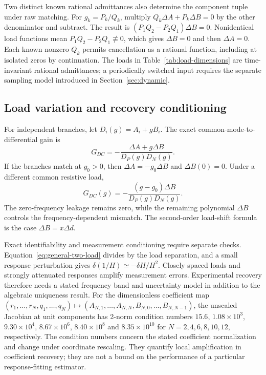 Two distinct known rational admittances also determine the component tuple under raw matching. For $g_k=P_k/Q_k$, multiply $Q_k\Delta A+P_k\Delta B=0$ by the other denominator and subtract. The result is $(P_1Q_2-P_2Q_1)\Delta B=0$. Nonidentical load functions mean $P_1Q_2-P_2Q_1\not\equiv0$, which gives $\Delta B=0$ and then $\Delta A=0$. Each known nonzero $Q_k$ permits cancellation as a rational function, including at isolated zeros by continuation. The loads in Table~\ref{tab:load-dimensions} are time-invariant rational admittances; a periodically switched input requires the separate sampling model introduced in Section~\ref{sec:dynamic}.

\subsection{Load variation and recovery conditioning}

For independent branches, let $D_i(g)=A_i+gB_i$. The exact common-mode-to-differential gain is
\begin{equation}\label{eq:general-leakage}
G_{DC}=-\frac{\Delta A+g\Delta B}{D_P(g)D_N(g)}.
\end{equation}
If the branches match at $g_0>0$, then $\Delta A=-g_0\Delta B$ and $\Delta B(0)=0$. Under a different common resistive load,
\begin{equation}\label{eq:general-load-shift}
G_{DC}(g)=-\frac{(g-g_0)\Delta B}{D_P(g)D_N(g)}.
\end{equation}
The zero-frequency leakage remains zero, while the remaining polynomial $\Delta B$ controls the frequency-dependent mismatch. The second-order load-shift formula is the case $\Delta B=x\Delta d$.

Exact identifiability and measurement conditioning require separate checks. Equation~\eqref{eq:general-two-load} divides by the load separation, and a small response perturbation gives $\delta(1/H)\simeq-\delta H/H^2$. Closely spaced loads and strongly attenuated responses amplify measurement errors. Experimental recovery therefore needs a stated frequency band and uncertainty model in addition to the algebraic uniqueness result.
For the dimensionless coefficient map $(r_1,\ldots,r_N,q_1,\ldots,q_N)\mapsto(A_{N,1},\ldots,A_{N,N},B_{N,0},\ldots,B_{N,N-1})$, the unscaled Jacobian at unit components has 2-norm condition numbers $15.6$, $1.08\times10^3$, $9.30\times10^4$, $8.67\times10^6$, $8.40\times10^8$ and $8.35\times10^{10}$ for $N=2,4,6,8,10,12$, respectively. The condition numbers concern the stated coefficient normalization and change under coordinate rescaling. They quantify local amplification in coefficient recovery; they are not a bound on the performance of a particular response-fitting estimator.
\FloatBarrier
